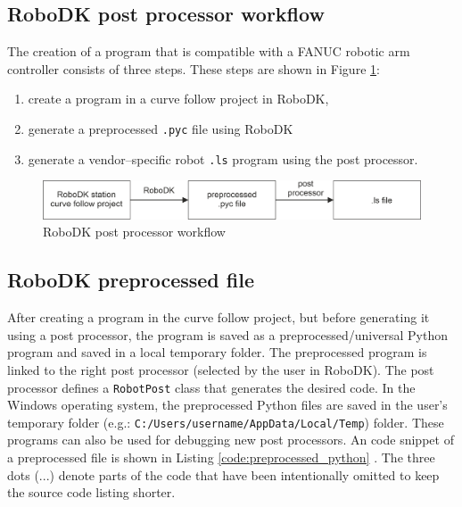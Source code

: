 \subsection{RoboDK post processor workflow}

The creation of a program that is compatible with a FANUC robotic arm controller consists of three steps. These steps are shown in Figure \ref{workflow}:

\begin{enumerate}
  \item create a program in a curve follow project in RoboDK,   
  \item generate a preprocessed \texttt{.pyc} file using RoboDK
  \item generate a vendor--specific robot \texttt{.ls} program using the post processor.
\end{enumerate}


\begin{figure}[h]
    \centering
    \includegraphics[width=0.9\linewidth]{img/workflow.jpg}
    \caption{RoboDK post processor workflow}
    \label{workflow}
\end{figure}


\subsection{RoboDK preprocessed file}

After creating a program in the curve follow project, but before generating it using a post processor, the program is saved as a preprocessed/universal Python program and saved in a local temporary folder. The preprocessed program is linked to the right post processor (selected by the user in RoboDK). The post processor defines a \texttt{RobotPost} class that generates the desired code. In the Windows operating system, the preprocessed Python files are saved in the user's temporary folder (e.g.: \texttt{C:/Users/username/AppData/Local/Temp}) folder. These programs can also be used for debugging new post processors. An code snippet of a preprocessed file is shown in Listing \ref{code:preprocessed_python} \cite{preprocessed}. The three dots (...) denote parts of the code that have been intentionally omitted to keep the source code listing shorter. 


